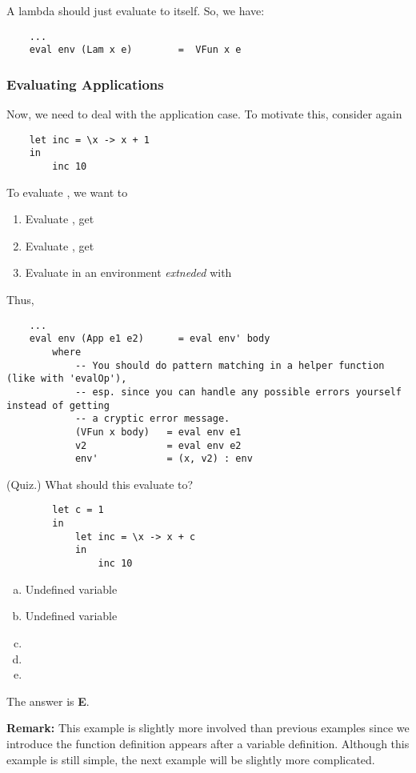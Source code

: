 \documentclass[letterpaper]{article}
\begin{document}
A lambda should just evaluate to itself. So, we have:
\begin{verbatim}
    ...
    eval env (Lam x e)        =  VFun x e\end{verbatim}

\subsubsection{Evaluating Applications}
Now, we need to deal with the application case. To motivate this, consider again 
\begin{verbatim}
    let inc = \x -> x + 1 
    in 
        inc 10 \end{verbatim}
To evaluate , we want to 
\begin{enumerate}
    \item Evaluate , get 
    \item Evaluate , get 
    \item Evaluate  in an environment \emph{extneded} with \code{[x := 10]}
\end{enumerate}

Thus, 
\begin{verbatim}
    ... 
    eval env (App e1 e2)      = eval env' body 
        where 
            -- You should do pattern matching in a helper function (like with 'evalOp'),
            -- esp. since you can handle any possible errors yourself instead of getting 
            -- a cryptic error message. 
            (VFun x body)   = eval env e1 
            v2              = eval env e2 
            env'            = (x, v2) : env\end{verbatim}

\begin{mdframed}[]
    (Quiz.) What should this evaluate to? 
    \begin{verbatim}
        let c = 1
        in 
            let inc = \x -> x + c 
            in 
                inc 10 \end{verbatim}
    \begin{enumerate}[(a)]
        \item Undefined variable 
        \item Undefined variable 
        \item {}
        \item {}
        \item {}
    \end{enumerate}

    \begin{mdframed}[]
        The answer is \textbf{E}.
    \end{mdframed}
\end{mdframed}
\textbf{Remark:} This example is slightly more involved than previous examples since we introduce the function definition appears after a variable definition. Although this example is still simple, the next example will be slightly more complicated.
\end{document}
